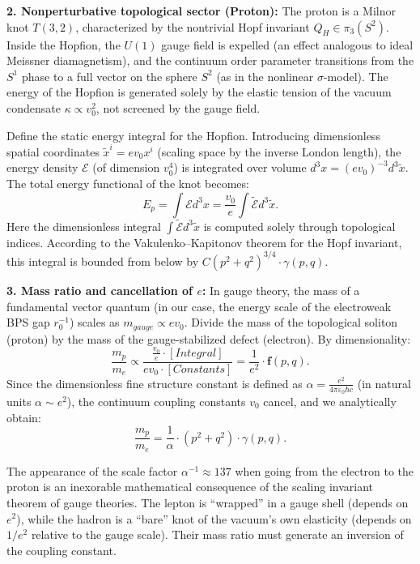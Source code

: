 \documentclass[11pt,a4paper]{article}
\begin{document}
\textbf{2. Nonperturbative topological sector (Proton):}
The proton is a Milnor knot $T(3,2)$, characterized by the nontrivial Hopf invariant $Q_H \in \pi_3(S^2)$.
Inside the Hopfion, the $U(1)$ gauge field is expelled (an effect analogous to ideal Meissner diamagnetism), and the continuum order parameter transitions from the $S^1$ phase to a full vector on the sphere $S^2$ (as in the nonlinear $\sigma$-model). The energy of the Hopfion is generated solely by the elastic tension of the vacuum condensate $\kappa \propto v_0^2$, not screened by the gauge field.

Define the static energy integral for the Hopfion. Introducing dimensionless spatial coordinates $\tilde{x}^i = e v_0 x^i$ (scaling space by the inverse London length), the energy density $\mathcal{E}$ (of dimension $v_0^4$) is integrated over volume $d^3x = (e v_0)^{-3} d^3\tilde{x}$.
The total energy functional of the knot becomes:
\begin{equation}
E_p = \int \mathcal{E} d^3x = \frac{v_0}{e} \int \tilde{\mathcal{E}} d^3\tilde{x}.
\end{equation}
Here the dimensionless integral $\int \tilde{\mathcal{E}} d^3\tilde{x}$ is computed solely through topological indices. According to the Vakulenko–Kapitonov theorem for the Hopf invariant, this integral is bounded from below by $C (p^2+q^2)^{3/4} \cdot \gamma(p,q)$.

\textbf{3. Mass ratio and cancellation of $e$:}
In gauge theory, the mass of a fundamental vector quantum (in our case, the energy scale of the electroweak BPS gap $r_0^{-1}$) scales as $m_{gauge} \propto e v_0$.
Divide the mass of the topological soliton (proton) by the mass of the gauge-stabilized defect (electron). By dimensionality:
\begin{equation}
\frac{m_p}{m_e} \propto \frac{\frac{v_0}{e} \cdot [Integral]}{e v_0 \cdot [Constants]} = \frac{1}{e^2} \cdot \mathbf{f}(p,q).
\end{equation}
Since the dimensionless fine structure constant is defined as $\alpha = \frac{e^2}{4\pi\varepsilon_0 \hbar c}$ (in natural units $\alpha \sim e^2$), the continuum coupling constants $v_0$ cancel, and we analytically obtain:
\begin{equation}
\frac{m_p}{m_e} = \frac{1}{\alpha} \cdot (p^2+q^2) \cdot \gamma(p,q).
\end{equation}

The appearance of the scale factor $\alpha^{-1} \approx 137$ when going from the electron to the proton is an inexorable mathematical consequence of the scaling invariant theorem of gauge theories. The lepton is ``wrapped'' in a gauge shell (depends on $e^2$), while the hadron is a ``bare'' knot of the vacuum's own elasticity (depends on $1/e^2$ relative to the gauge scale). Their mass ratio must generate an inversion of the coupling constant.
\end{document}
